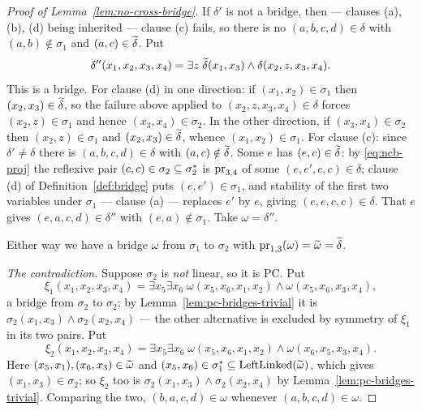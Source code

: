 \begin{proof}[Proof of Lemma~\ref{lem:no-cross-bridge}]
If $\delta'$ is not a bridge, then --- clauses (a), (b), (d) being inherited ---
clause (c) fails, so there is no $(a,b,c,d)\in\delta$ with
$(a,b)\notin\sigma_{1}$ and $(a,c)\in\widetilde{\delta}$. Put
\[
  \delta''(x_{1},x_{2},x_{3},x_{4})=\exists z\;
    \widetilde{\delta}(x_{1},x_{3})\wedge\delta(x_{2},z,x_{3},x_{4}).
\]
This is a bridge. For clause (d) in one direction: if
$(x_{1},x_{2})\in\sigma_{1}$ then $(x_{2},x_{3})\in\widetilde{\delta}$, so the
failure above applied to $(x_{2},z,x_{3},x_{4})\in\delta$ forces
$(x_{2},z)\in\sigma_{1}$ and hence $(x_{3},x_{4})\in\sigma_{2}$. In the other
direction, if $(x_{3},x_{4})\in\sigma_{2}$ then $(x_{2},z)\in\sigma_{1}$ and
$(x_{2},x_{3})\in\widetilde{\delta}$, whence $(x_{1},x_{2})\in\sigma_{1}$. For
clause (c): since $\delta'\neq\delta$ there is $(a,b,c,d)\in\delta$ with
$(a,c)\notin\widetilde{\delta}$. Some $e$ has $(e,c)\in\widetilde{\delta}$: by
\eqref{eq:ncb-proj} the reflexive pair $(c,c)\in\sigma_{2}\subseteq
\sigma_{2}^{*}$ is $\operatorname*{pr}_{3,4}$ of some $(e,e',c,c)\in\delta$; clause (d)
of Definition~\ref{def:bridge} puts $(e,e')\in\sigma_{1}$, and stability of the
first two variables under $\sigma_{1}$ --- clause (a) --- replaces $e'$ by $e$,
giving $(e,e,c,c)\in\delta$. That $e$ gives $(e,a,c,d)\in\delta''$ with
$(e,a)\notin\sigma_{1}$. Take $\omega=\delta''$.

Either way we have a bridge $\omega$ from $\sigma_{1}$ to $\sigma_{2}$ with
$\operatorname*{pr}_{1,3}(\omega)=\widetilde{\omega}=\widetilde{\delta}$.

\emph{The contradiction.} Suppose $\sigma_{2}$ is \emph{not} linear, so it is
PC. Put
\[
  \xi_{1}(x_{1},x_{2},x_{3},x_{4})=\exists x_{5}\exists x_{6}\;
    \omega(x_{5},x_{6},x_{1},x_{2})\wedge\omega(x_{5},x_{6},x_{3},x_{4}),
\]
a bridge from $\sigma_{2}$ to $\sigma_{2}$; by
Lemma~\ref{lem:pc-bridges-trivial} it is
$\sigma_{2}(x_{1},x_{3})\wedge\sigma_{2}(x_{2},x_{4})$ --- the other
alternative is excluded by symmetry of $\xi_{1}$ in its two pairs. Put
\[
  \xi_{2}(x_{1},x_{2},x_{3},x_{4})=\exists x_{5}\exists x_{6}\;
    \omega(x_{5},x_{6},x_{1},x_{2})\wedge\omega(x_{6},x_{5},x_{3},x_{4}).
\]
Here $(x_{5},x_{1}),(x_{6},x_{3})\in\widetilde{\omega}$ and
$(x_{5},x_{6})\in\sigma_{1}^{*}\subseteq\operatorname{LeftLinked}(\widetilde{\omega})$, which
gives $(x_{1},x_{3})\in\sigma_{2}$; so $\xi_{2}$ too is
$\sigma_{2}(x_{1},x_{3})\wedge\sigma_{2}(x_{2},x_{4})$ by
Lemma~\ref{lem:pc-bridges-trivial}. Comparing the two,
$(b,a,c,d)\in\omega$ whenever $(a,b,c,d)\in\omega$.


\end{proof}
